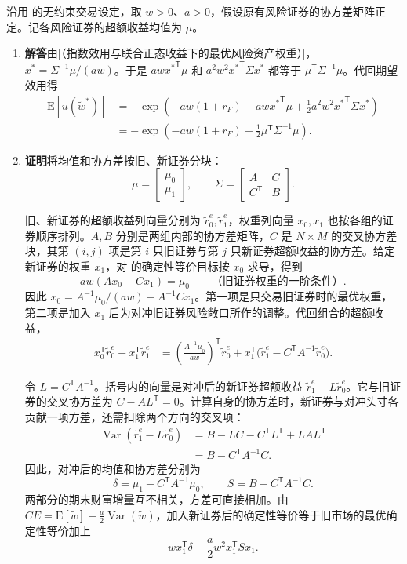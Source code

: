 \begin{solution}[blank-type=manual,blank-vsep=11\baselineskip]
沿用 的无约束交易设定，取 $w>0$、$a>0$，假设原有风险证券的协方差矩阵正定。记各风险证券的超额收益均值为 $\mu$。
\begin{enumerate}[label=(\alph*)]
 \item \textbf{解答}\quad 由[（指数效用与联合正态收益下的最优风险资产权重）]，$x^*=\Sigma^{-1}\mu/(aw)$。于是 $aw{x^*}^{\mathsf T}\mu$ 和 $a^2w^2{x^*}^{\mathsf T}\Sigma x^*$ 都等于 $\mu^{\mathsf T}\Sigma^{-1}\mu$。代回期望效用得
 \[
 \begin{aligned}
 \mathrm E[u(\tilde w^*)]
 &=-\exp\!\left(-aw(1+r_F)-aw{x^*}^{\mathsf T}\mu
               +\tfrac12a^2w^2{x^*}^{\mathsf T}\Sigma x^*\right)\\
 &=-\exp\!\left(-aw(1+r_F)-\tfrac12\mu^{\mathsf T}\Sigma^{-1}\mu\right).
 \end{aligned}
 \]

 \item \textbf{证明}\quad 将均值和协方差按旧、新证券分块：
 \[
 \mu=\begin{bmatrix}\mu_0\\\mu_1\end{bmatrix},\qquad
 \Sigma=\begin{bmatrix}A&C\\C^{\mathsf T}&B\end{bmatrix}.
 \]

 旧、新证券的超额收益列向量分别为 $\tilde r_0^e,\tilde r_1^e$，权重列向量 $x_0,x_1$ 也按各组的证券顺序排列。$A,B$ 分别是两组内部的协方差矩阵，$C$ 是 $N\times M$ 的交叉协方差块，其第 $(i,j)$ 项是第 $i$ 只旧证券与第 $j$ 只新证券超额收益的协方差。给定新证券的权重 $x_1$，对 的确定性等价目标按 $x_0$ 求导，得到
 \[
 aw(Ax_0+Cx_1)=\mu_0
 \qquad\text{（旧证券权重的一阶条件）}.
 \]
 因此 $x_0=A^{-1}\mu_0/(aw)-A^{-1}Cx_1$。第一项是只交易旧证券时的最优权重，第二项是加入 $x_1$ 后为对冲旧证券风险敞口所作的调整。代回组合的超额收益，
 \[
 \begin{aligned}
 x_0^{\mathsf T}\tilde r_0^e+x_1^{\mathsf T}\tilde r_1^e
 &=\left(\frac{A^{-1}\mu_0}{aw}\right)^{\mathsf T}\tilde r_0^e
   +x_1^{\mathsf T}\bigl(\tilde r_1^e-C^{\mathsf T}A^{-1}\tilde r_0^e\bigr).
 \end{aligned}
 \]

 令 $L=C^{\mathsf T}A^{-1}$。括号内的向量是对冲后的新证券超额收益 $\tilde r_1^e-L\tilde r_0^e$。它与旧证券的交叉协方差为 $C-AL^{\mathsf T}=0$。计算自身的协方差时，新证券与对冲头寸各贡献一项方差，还需扣除两个方向的交叉项：
 \[
 \begin{aligned}
 \operatorname{Var}(\tilde r_1^e-L\tilde r_0^e)
 &=B-LC-C^{\mathsf T}L^{\mathsf T}+LAL^{\mathsf T}\\
 &=B-C^{\mathsf T}A^{-1}C.
 \end{aligned}
 \]
 因此，对冲后的均值和协方差分别为
 \[
 \delta=\mu_1-C^{\mathsf T}A^{-1}\mu_0,\qquad
 S=B-C^{\mathsf T}A^{-1}C.
 \]
 两部分的期末财富增量互不相关，方差可直接相加。由 $CE=\mathrm E[\tilde w]-\tfrac a2\operatorname{Var}(\tilde w)$，加入新证券后的确定性等价等于旧市场的最优确定性等价加上
 \[
 w x_1^{\mathsf T}\delta-\frac a2 w^2x_1^{\mathsf T}Sx_1.
 \]


\end{enumerate}
\end{solution}

